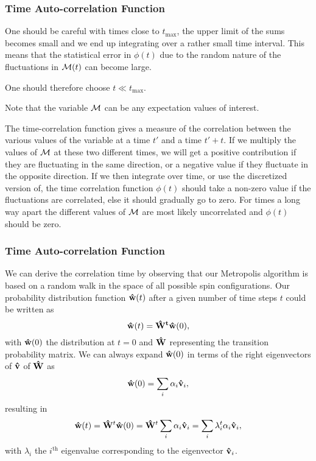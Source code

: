\documentclass[compress]{beamer}
\begin{document}
\frame
{
  \frametitle{Time Auto-correlation Function}
\begin{small}
{\scriptsize
One should be careful with times close to $t_{\mathrm{max}}$, the upper limit of the sums 
becomes small and we end up integrating over a rather small time interval. This means that the statistical
error in $\phi(t)$ due to the random nature of the fluctuations in ${\cal M}(t)$ can become large.

One should therefore choose $t \ll t_{\mathrm{max}}$.

Note that the variable ${\cal M}$ can be any expectation values of interest.



The time-correlation function gives a measure of the correlation between the various values of the variable 
at a time $t'$ and a time $t'+t$. If we multiply the values of ${\cal M}$ at these two different times,
we will get a positive contribution if they are fluctuating in the same direction, or a negative value
if they fluctuate in the opposite direction. If we then integrate over time, or use the discretized version of, the time correlation function $\phi(t)$ should take a non-zero value if the fluctuations are 
correlated, else it should gradually go to zero. For times a long way apart 
the different values of ${\cal M}$  are most likely 
uncorrelated and $\phi(t)$ should be zero.
}
\end{small}
}




\frame
{
  \frametitle{Time Auto-correlation Function}
\begin{small}
{\scriptsize
We can derive the correlation time by observing that our Metropolis algorithm is based on a random
walk in the space of all  possible spin configurations. 
Our probability 
distribution function ${\bf \hat{w}}(t)$ after a given number of time steps $t$ could be written as
\[
   {\bf \hat{w}}(t) = {\bf \hat{W}^t\hat{w}}(0),
\]
with ${\bf \hat{w}}(0)$ the distribution at $t=0$ and ${\bf \hat{W}}$ representing the 
transition probability matrix. 
We can always expand ${\bf \hat{w}}(0)$ in terms of the right eigenvectors of 
${\bf \hat{v}}$ of ${\bf \hat{W}}$ as 
\[
    {\bf \hat{w}}(0)  = \sum_i\alpha_i{\bf \hat{v}}_i,
\]
resulting in 
\[
   {\bf \hat{w}}(t) = {\bf \hat{W}}^t{\bf \hat{w}}(0)={\bf \hat{W}}^t\sum_i\alpha_i{\bf \hat{v}}_i=
\sum_i\lambda_i^t\alpha_i{\bf \hat{v}}_i,
\]
with $\lambda_i$ the $i^{\mathrm{th}}$ eigenvalue corresponding to  
the eigenvector ${\bf \hat{v}}_i$. 
}
\end{small}
}
\end{document}
